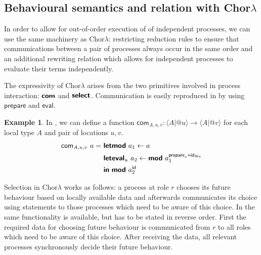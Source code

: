 \documentclass{scrartcl}
\theoremstyle{definition}
\newtheorem{example}{Example}
\theoremstyle{plain}
\begin{document}
\subsection{Behavioural semantics and relation with Chor$\lambda$}

In order to allow for out-of-order execution of of independent processes, we can use
the same machinery as Chor$\lambda$: restricting reduction rules to ensure that
communications between a pair of processes always occur in the same order and an
additional rewriting relation which allows for independent processes to evaluate
their terms independently.

The expressivity of Chor$\lambda$ arises from the two primitives involved in
process interaction: $\textsf{\textbf{com}}$ and $\textsf{\textbf{select}}$. Communication is
easily reproduced in \ChorMTT{} by using $\textsf{prepare}$ and $\textsf{eval}$.
\begin{example}
In \ChorMTT, we can define a function $\textsf{com}_{A,u,v} : \langle A | @u
\rangle \to \langle A | @v \rangle$ for each local type $A$ and pair of locations
$u,v$.
\begin{align*}\setlength{\jot}{0.5ex}
  \textsf{com}_{A,u,v}\ a =
  \ & \primitive{letmod}\ a_1 \leftarrow a\\
    & \primitive{leteval}_u\ a_2 \leftarrow
        \primitive{mod}\ a_1^{\textsf{prepare}_v * \textsf{id}_{@u}}\\
    & \primitive{in}\ \primitive{mod}\ a_2^{\textsf{id}}
\end{align*}
\end{example}
Selection in Chor$\lambda$ works as follows: a process at role $r$
chooses its future behaviour based on locally available data and afterwards
communicates its choice using  statements to those processes which need to
be aware of this choice. In \ChorMTT{} the same functionality is available, but has
to be stated in reverse order. First the required data for choosing future
behaviour is communicated from $r$ to all roles which need to be aware of this
choice. After receiving the data, all relevant processes synchronously decide
their future behaviour.
\end{document}
